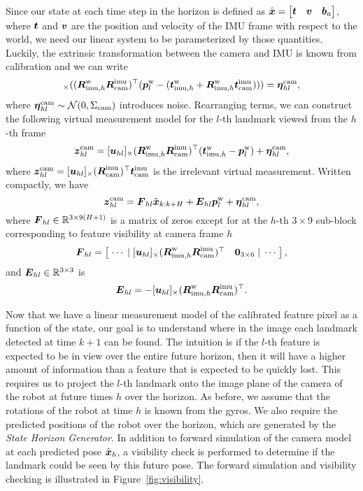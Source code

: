 Since our state at each time step in the horizon is defined as $\hat{\boldsymbol x}=\begin{bmatrix}\boldsymbol t&\boldsymbol v&\boldsymbol b_a\end{bmatrix}$, where $\boldsymbol t$ and $\boldsymbol v$ are the position and velocity of the IMU frame with respect to the world, we need our linear system to be parameterized by those quantities.
Luckily, the extrinsic transformation between the camera and IMU is known from calibration and we can write
\begin{equation*}
[\uhl]_\times((\RWIh\RIC)^\top(\pWL-(\tWIh+\RWIh\tIC))) = \nhl,
\end{equation*}
where $\boldsymbol \eta_{hl}^\text{cam}\sim\mathcal{N}(0,\Sigma_\text{cam})$ introduces noise.
Rearranging terms, we can construct the following virtual measurement model for the $l$-th landmark viewed from the $h$-th frame
\begin{equation*}
\boldsymbol z_{hl}^\text{cam} = [\boldsymbol u_{hl}]_\times(\boldsymbol R^\text{w}_{\text{imu},h}\boldsymbol R^\text{imu}_\text{cam})^\top(\boldsymbol t^\text{w}_{\text{imu},h}-\boldsymbol p^\text{w}_l) + \boldsymbol \eta_{hl}^\text{cam},
\end{equation*}
where $\boldsymbol z_{hl}^\text{cam}=[\boldsymbol u_{hl}]_\times(\boldsymbol R^\text{imu}_\text{cam})^\top\boldsymbol t^\text{imu}_\text{cam}$ is the irrelevant virtual measurement.
Written compactly, we have
\begin{equation}\label{eqn:vision-model}
\boldsymbol z_{hl}^\text{cam} = \boldsymbol F_{hl}\hat{\boldsymbol x}_{k:k+H} + \boldsymbol E_{hl}\boldsymbol p^\text{w}_l + \boldsymbol \eta_{hl}^\text{cam},
\end{equation}
where $\boldsymbol F_{hl}\in\mathbb{R}^{3\times 9(H+1)}$ is a matrix of zeros except for at the $h$-th $3\times 9$ sub-block corresponding to feature visibility at camera frame $h$
\begin{equation*}
\boldsymbol F_{hl} =
\begin{bmatrix}
\;\cdots\;|\;[\boldsymbol u_{hl}]_\times(\boldsymbol R^\text{w}_{\text{imu},h}\boldsymbol R^\text{imu}_\text{cam})^\top & \boldsymbol 0_{3\times 6}\;|\;\cdots\;
\end{bmatrix},
\end{equation*}
and $\boldsymbol E_{hl}\in\mathbb{R}^{3\times 3}$ is
\begin{equation*}
\boldsymbol E_{hl} = -[\boldsymbol u_{hl}]_\times(\boldsymbol R^\text{w}_{\text{imu},h}\boldsymbol R^\text{imu}_\text{cam})^\top.
\end{equation*}

Now that we have a linear measurement model of the calibrated feature pixel as a function of the state, our goal is to understand where in the image each landmark detected at time $k+1$ can be found.
The intuition is if the $l$-th feature is expected to be in view over the entire future horizon, then it will have a higher amount of information than a feature that is expected to be quickly lost.
This requires us to project the $l$-th landmark onto the image plane of the camera of the robot at future times $h$ over the horizon.
As before, we assume that the rotations of the robot at time $h$ is known from the gyros.
We also require the predicted positions of the robot over the horizon, which are generated by the \emph{State Horizon Generator}.
In addition to forward simulation of the camera model at each predicted pose $\hat{\boldsymbol x}_h$, a visibility check is performed to determine if the landmark could be seen by this future pose.
The forward simulation and visibility checking is illustrated in Figure~\ref{fig:visibility}.

